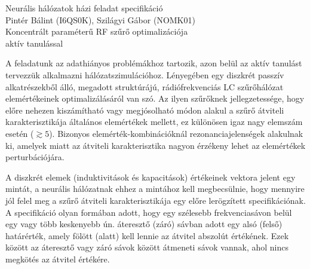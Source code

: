 \documentclass[12pt,a4paper,oneside]{report}
\begin{document}
\begin{center}
	\huge{Neurális hálózatok házi feladat specifikáció} \\
	\vspace*{0.5cm}
	\large{Pintér Bálint (I6QS0K), Szilágyi Gábor (NOMK01)}\\
	\vspace*{0.5cm}
	\Large{Koncentrált paraméterű RF szűrő optimalizációja \\ aktív tanulással}
\end{center}
A feladatunk az adathiányos problémákhoz tartozik, azon belül az aktív tanulást tervezzük alkalmazni hálózatszimulációhoz. Lényegében egy diszkrét passzív alkatrészekből álló, megadott struktúrájú, rádiófrekvenciás LC szűrőhálózat elemértékeinek optimalizálásáról van szó. Az ilyen szűrőknek jellegzetessége, hogy előre nehezen kiszámítható vagy megjósolható módon alakul a szűrő átviteli karakterisztikája általános elemértékek mellett, ez különösen igaz nagy elemszám esetén ($\gtrsim5$). Bizonyos elemérték-kombinációknál rezonanciajelenségek alakulnak ki, amelyek miatt az átviteli karakterisztika nagyon érzékeny lehet az elemértékek perturbációjára. 

A diszkrét elemek (induktivitások és kapacitások) értékeinek vektora jelent egy mintát, a neurális hálózatnak ehhez a mintához kell megbecsülnie, hogy mennyire jól felel meg a szűrő átviteli karakterisztikája egy előre lerögzített specifikációnak. A specifikáció olyan formában adott, hogy egy szélesebb frekvenciasávon belül egy vagy több keskenyebb ún. áteresztő (záró) sávban adott egy alsó (felső) határérték, amely fölött (alatt) kell lennie az átvitel abszolút értékének. Ezek között az áteresztő vagy záró sávok között átmeneti sávok vannak, ahol nincs megkötés az átvitel értékére.
\end{document}
